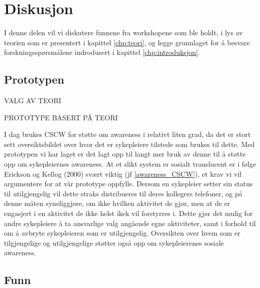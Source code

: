 \chapter{Diskusjon}
\label{chp:diskusjon}
I denne delen vil vi diskutere funnene fra workshopene som ble holdt, i lys av teorien som er presentert i kapittel \ref{chp:teori}, og legge grunnlaget for å besvare forskningsspørsmålene indrodusert i kapittel \ref{chp:introduksjon}.

\section{Prototypen}
\label{protoDisk}

VALG AV TEORI

PROTOTYPE BASERT PÅ TEORI

\noindent
I dag brukes CSCW for støtte om awareness i relativt liten grad, da det er stort sett oversiktsbildet over hvor det er sykepleiere tilstede som brukes til dette. Med prototypen vi har laget er det lagt opp til langt mer bruk av denne til å støtte opp om sykepleiernes awareness. At et slikt system er sosialt translucent er i følge Erickson og Kellog (2000) svært viktig (jf \ref{awareness_CSCW}), et krav vi vil argumentere for at vår prototype oppfylle. Dersom en sykepleier setter sin status til utilgjengelig vil dette straks distribueres til deres kollegers telefoner, og på denne måten syneliggjøre, om ikke hvilken aktivitet de gjør, men at de er engasjert i en aktivitet de ikke helst ikek vil forstyrres i. Dette gjør det mulig for andre sykepleiere å ta ansvarlige valg angående egne aktiviteter, samt i forhold til om å avbryte sykepleieren som er utilgjengelig. Oversikten over hvem som er tilgjengelige og utilgjengelige støtter også opp om sykepleierenes sosiale awareness.

\section{Funn}

